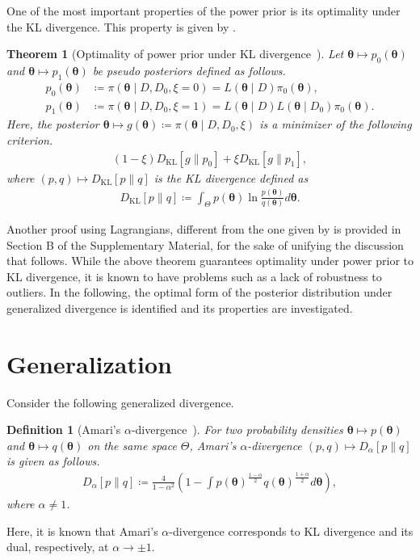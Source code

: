 \documentclass[12pt]{article}
\newtheorem{definition}{Definition}
\newtheorem{theorem}{Theorem}
\begin{document}
One of the most important properties of the power prior is its optimality under the KL divergence.
This property is given by \citet{Ibrahim01032003}.
\begin{theorem}[Optimality of power prior under KL divergence~\citep{Ibrahim01032003}]
    \label{thm:optimality_under_kl_divergence}
    Let $\bm{\theta} \mapsto p_0(\bm{\theta})$ and $\bm{\theta} \mapsto p_1(\bm{\theta})$ be pseudo posteriors defined as follows.
    \begin{align*}
        p_0(\bm{\theta}) &\coloneqq \pi(\bm{\theta} \mid D, D_0, \xi = 0) = L(\bm{\theta} \mid D)\pi_0(\bm{\theta}), \\
        p_1(\bm{\theta}) &\coloneqq \pi(\bm{\theta} \mid D, D_0, \xi = 1) = L(\bm{\theta} \mid D)L(\bm{\theta} \mid D_0)\pi_0(\bm{\theta}).
    \end{align*}
    Here, the posterior $\bm{\theta} \mapsto g(\bm{\theta}) \coloneqq \pi(\bm{\theta} \mid D, D_0, \xi)$ is a minimizer of the following criterion.
    \begin{align*}
        (1 - \xi) D_{\mathrm{KL}}[g \| p_0] + \xi D_{\mathrm{KL}}[g \| p_1],
    \end{align*}
    where $(p, q) \mapsto D_{\mathrm{KL}}[p \| q]$ is the KL divergence defined as
    \begin{align*}
        D_{\mathrm{KL}}[p \| q] \coloneqq \int_\Theta p(\bm{\theta})\ln\frac{p(\bm{\theta})}{q(\bm{\theta})}d\bm{\theta}.
    \end{align*}
\end{theorem}
Another proof using Lagrangians, different from the one given by \citet{Ibrahim01032003} is provided in Section B of the Supplementary Material, for the sake of unifying the discussion that follows.
While the above theorem guarantees optimality under power prior to KL divergence, it is known to have problems such as a lack of robustness to outliers.
In the following, the optimal form of the posterior distribution under generalized divergence is identified and its properties are investigated.

\section{Generalization}
\label{sec:generalization}
Consider the following generalized divergence.
\begin{definition}[Amari's $\alpha$-divergence~\citep{amari2009alpha}]
    \label{def:alpha_divergence}
    For two probability densities $\bm{\theta} \mapsto p(\bm{\theta})$ and $\bm{\theta} \mapsto q(\bm{\theta})$ on the same space $\Theta$, Amari's $\alpha$-divergence $(p, q) \mapsto D_\alpha[p \| q]$ is given as follows.
    \begin{align*}
        D_\alpha[p \| q] \coloneqq \frac{4}{1 - \alpha^2}\left(1 - \int p(\bm{\theta})^{\frac{1 - \alpha}{2}}q(\bm{\theta})^{\frac{1 + \alpha}{2}} d\bm{\theta} \right),
    \end{align*}
    where $\alpha \neq 1$.
\end{definition}
Here, it is known that Amari's $\alpha$-divergence corresponds to KL divergence and its dual, respectively, at $\alpha \to \pm 1$.
\end{document}
